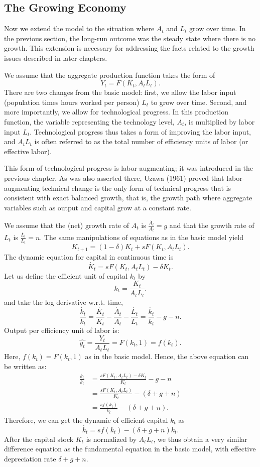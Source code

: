 \subsection{The Growing Economy}

Now we extend the model to the situation where $A_t$ and $L_t$ grow over time. 
In the previous section, the long-run outcome was the steady state where there is no growth.
This extension is necessary for addressing the facts related to the growth issues described in later chapters.

We assume that the aggregate production function takes the form of
\[
Y_t = F(K_t, A_t L_t).
\]
There are two changes from the basic model: 
first, we allow the labor input (population times hours worked per person) $L_t$ to grow over time. 
Second, and more importantly, we allow for technological progress. 
In this production function, the variable representing the technology level, $A_t$, 
is multiplied by labor input $L_t$. 
Technological progress thus takes a form of improving the labor input, 
and $A_t L_t$ is often referred to as the total number of efficiency units of labor (or effective labor). 

This form of technological progress is labor-augmenting; it was introduced in the previous chapter. 
As was also asserted there, Uzawa (1961) proved that labor-augmenting technical change is the only form of technical progress that is consistent with exact balanced growth, 
that is, the growth path where aggregate variables such as output and capital grow at a constant rate. 

We assume that the (net) growth rate of $A_t$ is $\frac{\dot{A_t}}{A_t} = g$ and that the growth rate of $L_t$ is $\frac{\dot{L_t}}{L_t} = n$. The same manipulations of equations as in the basic model yield
\[
K_{t+1} = (1 - \delta)K_t + sF(K_t, A_t L_t).
\]
The dynamic equation for capital in continuous time is
\[
\dot{K_t} = sF(K_t, A_t L_t) - \delta K_t.
\]
Let us define the efficient unit of capital $k_t$ by
\[
k_t = \frac{K_t}{A_t L_t}.
\]
and take the log derivative w.r.t. time,
\[
\frac{\dot{k_t}}{k_t} = \frac{\dot{K_t}}{K_t} - \frac{\dot{A_t}}{A_t} - \frac{\dot{L_t}}{L_t} = \frac{\dot{k_t}}{k_t} - g - n.
\]
Output per efficiency unit of labor is:
\[
\hat{y_t} = \frac{Y_t}{A_t L_t} = F(k_t, 1) = f(k_t).
\]
Here, $f(k_t) = F(k_t, 1)$ as in the basic model. Hence, the above equation can be written as:
\begin{align*}
    \frac{\dot{k_t}}{k_t} &= \frac{sF(K_t, A_t L_t) - \delta K_t}{K_t} - g - n\\
    &= \frac{sF(K_t, A_t L_t)}{K_t} - (\delta + g + n) \\
    &= \frac{sf(k_t)}{k_t} - (\delta + g + n).
\end{align*}
Therefore, we can get the dynamic of efficient capital $k_t$ as
\[
\dot{k_t} = sf(k_t) - (\delta + g + n)k_t.
\]
After the capital stock $K_t$ is normalized by $A_t L_t$, 
we thus obtain a very similar difference equation as the fundamental equation in the basic model,
with effective depreciation rate $\delta + g + n$.

